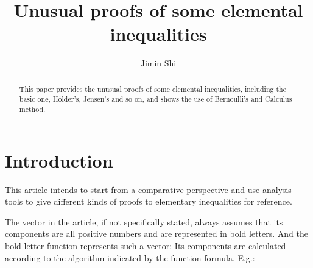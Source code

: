 \documentclass[12pt,a4paper,reqno]{amsart}
\theoremstyle{plain}
\theoremstyle{definition}
\begin{document}
\title{Unusual proofs of some elemental inequalities}


\author{Jimin Shi}

\address{Shanxi Normail University \\ Department of Mathematics \\
\\ Linfen, Shanxi 041000 \\ P. R. China} 









\begin{abstract} This paper provides the unusual proofs of some elemental inequalities, including the basic one, H\"older's, Jensen's and so on, and shows the use of Bernoulli's and Calculus method.
\end{abstract}

\maketitle

\section{Introduction} 
This article intends to start from a comparative perspective and use analysis tools to give different kinds of proofs to elementary inequalities for reference.

The vector in the article, if not specifically stated, always assumes that its components are all positive numbers and are represented in bold letters. And the bold letter function represents such a vector: Its components are calculated according to the algorithm indicated by the function formula. E.g.: 
\end{document}
